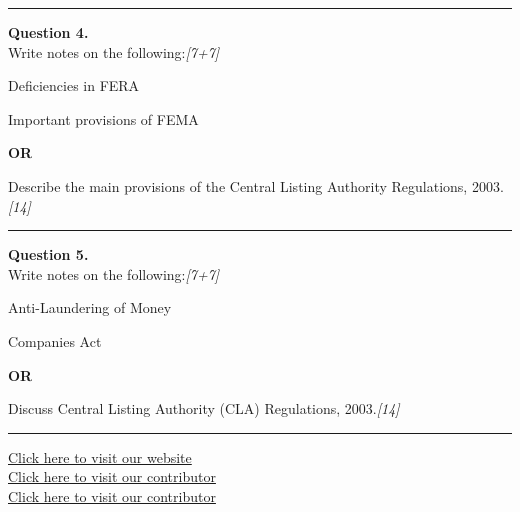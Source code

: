\documentclass[11pt,a4paper]{article}
\newcommand{\pts}[1]{\hfill   \textit{[#1]}}
\begin{document}
\medskip\rule{\linewidth}{0.2pt}




\noindent   \textbf{Question 4.} \\
Write notes on the following:\pts{7+7}

\begin{parts}
  \item Deficiencies in FERA
  \item Important provisions of FEMA
\end{parts}

\centerline{   \textbf{OR}}

Describe the main provisions of the Central Listing Authority Regulations, 2003.\pts{14}

\medskip\rule{\linewidth}{0.2pt}




\noindent   \textbf{Question 5.} \\
Write notes on the following:\pts{7+7}

\begin{parts}
  \item Anti-Laundering of Money
  \item Companies Act
\end{parts}

\centerline{   \textbf{OR}}

Discuss Central Listing Authority (CLA) Regulations, 2003.\pts{14}

\vfill
\rule{\linewidth}{0.4pt}

\begin{center}\small
\href{https://bhu-exam.vercel.app/}{Click here to visit our website}\\[4pt]
\href{https://me-aryan.vercel.app/}{Click here to visit our contributor}\\[4pt]
\href{https://quashan-me.vercel.app/}{Click here to visit our contributor}
\end{center}
\end{document}
